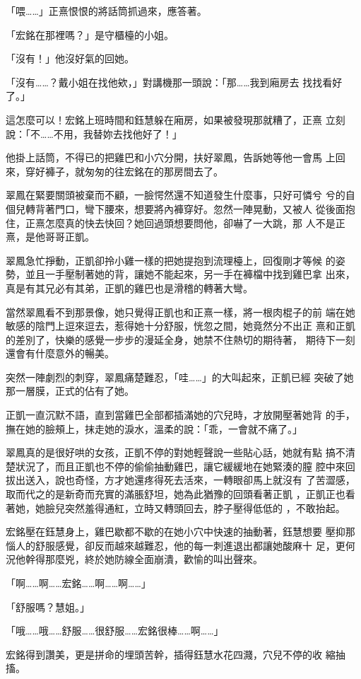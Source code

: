 「喂……」正熹恨恨的將話筒抓過來，應答著。

「宏銘在那裡嗎？」是守櫃檯的小姐。

「沒有！」他沒好氣的回她。

「沒有……？戴小姐在找他欸，」對講機那一頭說：「那……我到廂房去
找找看好了。」

這怎麼可以！宏銘上班時間和鈺慧躲在廂房，如果被發現那就糟了，正熹
立刻說：「不……不用，我替妳去找他好了！」

他掛上話筒，不得已的把雞巴和小穴分開，扶好翠鳳，告訴她等他一會馬
上回來，穿好褲子，就匆匆的往宏銘在的那房間去了。

翠鳳在緊要關頭被棄而不顧，一臉愕然還不知道發生什麼事，只好可憐兮
兮的自個兒轉背著門口，彎下腰來，想要將內褲穿好。忽然一陣晃動，又被人
從後面抱住，正熹怎麼真的快去快回？她回過頭想要問他，卻嚇了一大跳，那
人不是正熹，是他哥哥正凱。

翠鳳急忙掙動，正凱卻拎小雞一樣的把她提抱到流理檯上，回復剛才等候
的姿勢，並且一手壓制著她的背，讓她不能起來，另一手在褲檔中找到雞巴拿
出來，真是有其兄必有其弟，正凱的雞巴也是滑稽的轉著大彎。

當然翠鳳看不到那景像，她只覺得正凱也和正熹一樣，將一根肉棍子的前
端在她敏感的陰門上逗來逗去，惹得她十分舒服，恍忽之間，她竟然分不出正
熹和正凱的差別了，快樂的感覺一步步的漫延全身，她禁不住熱切的期待著，
期待下一刻還會有什麼意外的暢美。

突然一陣劇烈的刺穿，翠鳳痛楚難忍，「哇……」的大叫起來，正凱已經
突破了她那一層膜，正式的佔有了她。

正凱一直沉默不語，直到當雞巴全部都插滿她的穴兒時，才放開壓著她背
的手，撫在她的臉頰上，抹走她的淚水，溫柔的說：「乖，一會就不痛了。」

翠鳳真的是很好哄的女孩，正凱不停的對她輕聲說一些貼心話，她就有點
搞不清楚狀況了，而且正凱也不停的偷偷抽動雞巴，讓它緩緩地在她緊湊的膣
腔中來回拔出送入，說也奇怪，方才她還疼得死去活來，一轉眼卻馬上就沒有
了苦澀感，取而代之的是新奇而充實的滿脹舒坦，她為此猶豫的回頭看著正凱
，正凱正也看著她，她臉兒突然羞得通紅，立時又轉頭回去，脖子壓得低低的
，不敢抬起。

宏銘壓在鈺慧身上，雞巴歇都不歇的在她小穴中快速的抽動著，鈺慧想要
壓抑那惱人的舒服感覺，卻反而越來越難忍，他的每一刺進退出都讓她酸麻十
足，更何況他幹得那麼兇，終於她防線全面崩潰，歡愉的叫出聲來。

「啊……啊……宏銘……啊……啊……」

「舒服嗎？慧姐。」

「哦……哦……舒服……很舒服……宏銘很棒……啊……」

宏銘得到讚美，更是拼命的埋頭苦幹，插得鈺慧水花四濺，穴兒不停的收
縮抽搐。

